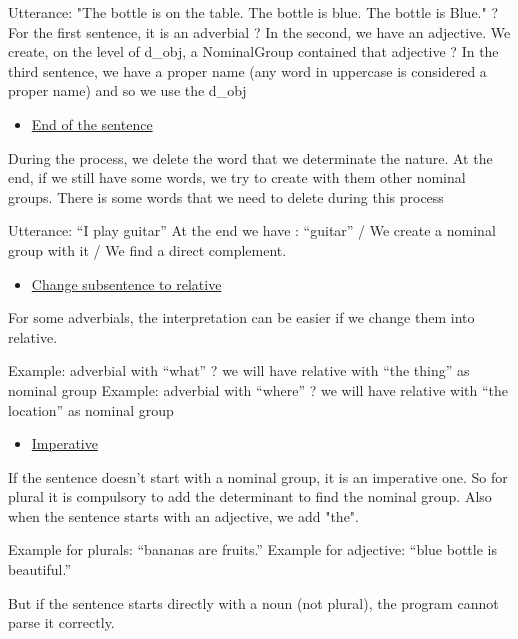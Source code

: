 \documentclass[twoside,a4paper,10pt]{report}
\begin{document}
\small
\begin{verbatimtab}
  Utterance: "The bottle is on the table. The bottle is blue. The bottle is Blue."
  ? For the first sentence, it is an adverbial
  ? In the second, we have an adjective. We create, on the level  of d_obj, a NominalGroup
contained that adjective
  ? In the third sentence, we have a proper name (any word in uppercase is considered a proper name)
and so we use the d_obj
\end{verbatimtab}
\normalsize

\begin{itemize}
    \item  \underline{End of the sentence}
\end{itemize}
During the process, we delete the word that we determinate the nature. At the end, if we still have some words, we try to create with them other nominal groups. There is some words that we need to delete during this process


\small
\begin{verbatimtab}
  Utterance: “I play guitar”
  At the end we have : “guitar” / We create a nominal group with it / We find a direct
complement.
\end{verbatimtab}
\normalsize

\begin{itemize}
    \item  \underline{Change subsentence to relative}
\end{itemize}
For some adverbials, the interpretation can be easier if we change them into relative.


\small
\begin{verbatimtab}
  Example: adverbial with “what” ? we will have relative with “the thing” as nominal group
  Example: adverbial with “where” ? we will have relative with “the location” as nominal
group
\end{verbatimtab}
\normalsize

\begin{itemize}
    \item  \underline{Imperative}
\end{itemize}
If the sentence doesn’t start with a nominal group, it is an imperative one. So for plural it is compulsory to add the determinant to find the nominal group. Also when the sentence starts with an adjective, we add "the".


\small
\begin{verbatimtab}
  Example for plurals: “bananas are fruits.”
  Example for adjective: “blue bottle is beautiful.”
\end{verbatimtab}
\normalsize
But if the sentence starts directly with a noun (not plural), the program cannot parse it correctly.
\end{document}
